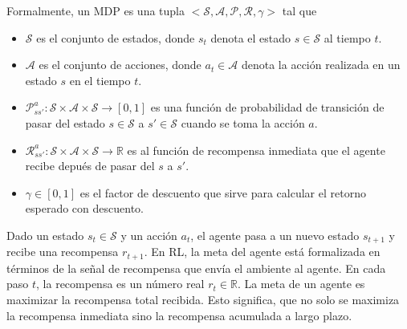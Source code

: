 Formalmente, un MDP es una tupla $< \mathcal{S}, \mathcal{A}, \mathcal{P}, \mathcal{R}, \gamma>$ tal que

\begin{itemize}
    \item $\mathcal{S}$ es el conjunto de estados, donde $s_t$ denota el estado $s\in \mathcal{S}$ al tiempo $t$.
    \item $\mathcal{A}$ es el conjunto de acciones, donde $a_t \in \mathcal{A}$
    denota la acción realizada en un estado $s$ en el tiempo $t$.
    \item $\mathcal{P}_{ss'}^{a}: \mathcal{S}\times \mathcal{A} \times \mathcal{S} \rightarrow [0, 1]$ es una función de probabilidad de transición de pasar del estado $s \in \mathcal{S}$ a $s' \in \mathcal{S}$ cuando se toma la acción $a$.%
    \item $\mathcal{R}_{ss'}^{a}: \mathcal{S} \times \mathcal{A} \times \mathcal{S} \rightarrow \mathbb{R}$ es al función de recompensa inmediata que el agente recibe depués de pasar del $s$ a $s'$.
    \item $\gamma \in [0,1]$ es el factor de descuento que sirve para
    calcular el retorno esperado con descuento.
\end{itemize}





Dado un estado $s_t \in \mathcal{S}$ y un
acción $a_t$, el agente pasa a un nuevo
estado $s_{t+1}$ y recibe una recompensa
$r_{t+1}$.
En RL, la meta del agente está formalizada
en términos de la señal de recompensa que
envía el ambiente al agente. En cada paso $t$, la recompensa es un número real $r_t \in \mathbb{R}$. La meta de un agente
es maximizar la recompensa total recibida.
Esto significa, que no solo se maximiza la recompensa inmediata sino la recompensa acumulada a largo plazo.

